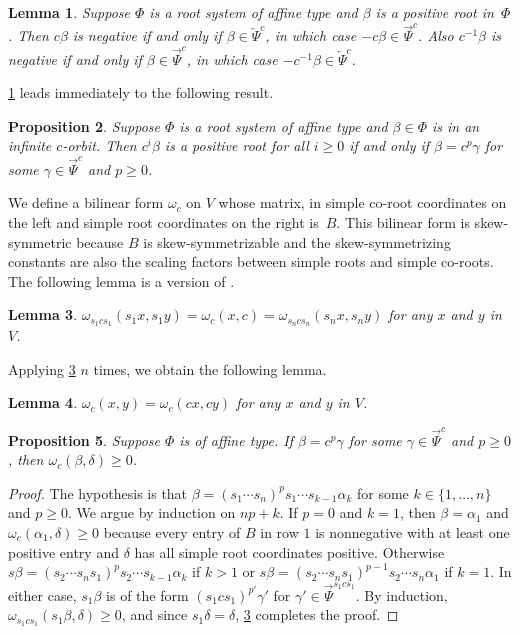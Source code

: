\documentclass{amsart}
\newtheorem{proposition}{Proposition}[section]
\newtheorem{lemma}[proposition]{Lemma}
\theoremstyle{definition}
\theoremstyle{remark}
\numberwithin{equation}{section}
\newcommand{\set}[1]{{\lbrace #1 \rbrace}}
\newcommand{\0}{{\mathbf{0}}}
\newcommand{\RSChar}{\Phi}
\newcommand{\RS}{\RSChar}
\newcommand{\TravInfChar}{\Psi}
\newcommand{\TravProj}[1]{\overrightarrow{\TravInfChar}^{#1}}
\newcommand{\TravInj}[1]{\overleftarrow{\TravInfChar}^{#1}}
\begin{document}
\begin{lemma}\label{c to pos}
Suppose $\RS$ is a root system of affine type and $\beta$ is a positive root in~$\RS$. 
Then $c\beta$ is negative if and only if $\beta\in\TravInj{c}$, in which case $-c\beta\in\TravProj{c}$.
Also $c^{-1}\beta$ is negative if and only if $\beta\in\TravProj{c}$, in which case $-c^{-1}\beta\in\TravInj{c}$.
\end{lemma}

\cref{c to pos} leads immediately to the following result.
\begin{proposition}\label{who is pos}
Suppose $\RS$ is a root system of affine type and $\beta\in\RS$ is in an infinite $c$-orbit.
Then $c^i\beta$ is a positive root for all $i\ge0$ if and only if $\beta=c^p\gamma$ for some $\gamma\in\TravProj{c}$ and $p\ge0$.
\end{proposition}

We define a bilinear form $\omega_c$ on $V$ whose matrix, in simple co-root coordinates on the left and simple root coordinates on the right is~$B$.
This bilinear form is skew-symmetric because $B$ is skew-symmetrizable and the skew-symmetrizing constants are also the scaling factors between simple roots and simple co-roots.
The following lemma is a version of \cite[Lemma~3.8]{typefree}.

\begin{lemma}\label{omega s}
$\omega_{s_1cs_1}(s_1x,s_1y)=\omega_c(x,c)=\omega_{s_ncs_n}(s_nx,s_ny)$ for any $x$ and $y$ in~$V$.
\end{lemma}

Applying \cref{omega s} $n$ times, we obtain the following lemma.

\begin{lemma}\label{omega c}
$\omega_c(x,y)=\omega_c(cx,cy)$ for any $x$ and $y$ in $V$.
\end{lemma}

\begin{proposition}\label{om del}
Suppose $\RS$ is of affine type.
If $\beta=c^p\gamma$ for some $\gamma\in\TravProj{c}$ and $p\ge0$, then $\omega_c(\beta,\delta)\ge0$. 
\end{proposition}
\begin{proof}
The hypothesis is that $\beta=(s_1\cdots s_n)^ps_1\cdots s_{k-1}\alpha_k$ for some $k\in\set{1,\ldots,n}$ and $p\ge0$.
We argue by induction on $np+k$.
If $p=0$ and $k=1$, then $\beta=\alpha_1$ and $\omega_c(\alpha_1,\delta)\ge0$ because every entry of $B$ in row $1$ is nonnegative with at least one positive entry and $\delta$ has all simple root coordinates positive.
Otherwise ${s\beta=(s_2\cdots s_ns_1)^ps_2\cdots s_{k-1}\alpha_k}$ if $k>1$ or $s\beta=(s_2\cdots s_ns_1)^{p-1}s_2\cdots s_n\alpha_1$ if $k=1$.
In either case, $s_1\beta$ is of the form $(s_1cs_1)^{p'}\gamma'$ for $\gamma'\in\TravProj{s_1cs_1}$.
By induction, $\omega_{s_1cs_1}(s_1\beta,\delta)\ge0$, and since $s_1\delta=\delta$, \cref{omega s} completes the proof.
\end{proof}
\end{document}

